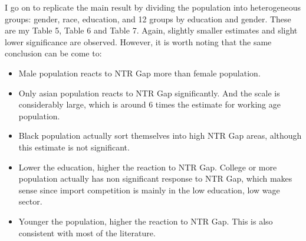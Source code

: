 \documentclass[12pt, final]{CSP}
\begin{document}
\noindent
I go on to replicate the main result by dividing the population into heterogeneous groups: gender, race, education, and 12 groups by education and gender. These are my Table 5, Table 6 and Table 7. Again, slightly smaller estimates and slight lower significance are observed. However, it is worth noting that the same conclusion can be come to: 
\newline
\begin{itemize}
    \item Male population reacts to NTR Gap more than female population. \\
    \item Only asian population reacts to NTR Gap significantly. And the scale is considerably large, which is around 6 times the estimate for working age population. \\
    \item Black population actually sort themselves into high NTR Gap areas, although this estimate is not significant. \\
    \item Lower the education, higher the reaction to NTR Gap. College or more population actually has non significant response to NTR Gap, which makes sense since import competition is mainly in the low education, low wage sector. \\
    \item Younger the population, higher the reaction to NTR Gap. This is also consistent with most of the literature. \\
\end{itemize}
\end{document}
